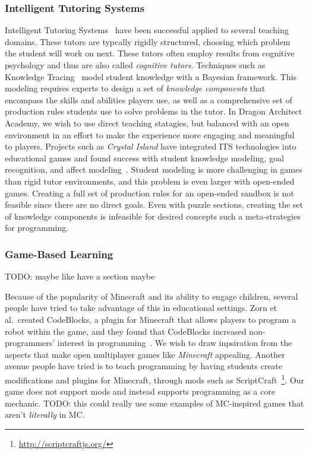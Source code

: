 \documentclass{sig-alternate}
\newcommand{\TODO}[1]{{\color{red} TODO: #1}}
\newcommand{\gametitle}{{\color{RoyalPurple} Dragon Architect Academy}}
\begin{document}
\subsubsection{Intelligent Tutoring Systems}
Intelligent Tutoring Systems~\cite{koedinger06cognitive} have been successful applied to several teaching domains.
These tutors are typcally rigidly structured, choosing which problem the student will work on next.
These tutors often employ results from cognitive psychology and thus are also called \emph{cognitive tutors}.
Techniques such as Knowledge Tracing~\cite{corbett1994knowledge} model student knowledge with a Bayesian framework.
This modeling requires experts to design a set of \emph{knowledge components} that encompass the skills and abilities players use, as well as a comprehensive set of production rules students use to solve problems in the tutor.
In \gametitle{}, we wish to use direct teaching statagies, but balanced with an open environment in an effort to make the experience more engaging and meaningful to players.
Projects such as \emph{Crystal Island} have integrated ITS technologies into educational games and found success with student knowledge modeling, goal recognition, and affect modeling~\cite{lester2013serious,rowe2010modeling}.
Student modeling is more challenging in games than rigid tutor environments, and this problem is even larger with open-ended games.
Creating a full set of production rules for an open-ended sandbox is not feasible since there are no direct goals.
Even with puzzle sections, creating the set of knowledge components is infeasible for desired concepts such a meta-strategies for programming.

\subsubsection{Game-Based Learning}
\TODO{maybe like have a section maybe}

Because of the popularity of Minecraft and its ability to engage children, several people have tried to take advantage of this in educational settings.
Zorn et al.\ created CodeBlocks, a plugin for Minecraft that allows players to program a robot within the game, and they found that CodeBlocks increased non-programmers' interest in programming~\cite{zorn2013minecraft}.
We wish to draw inpsiration from the aspects that make open multiplayer games like \emph{Minecraft} appealing.
Another avenue people have tried is to teach programming by having students create modifications and plugins for Minecraft, through mods such as ScriptCraft~\footnote{\url{http://scriptcraftjs.org/}}.
Our game does not support mods and instead supports programming as a core mechanic.
\TODO{this could really use some examples of MC-inspired games that aren't \emph{literally} in MC.}
\end{document}
